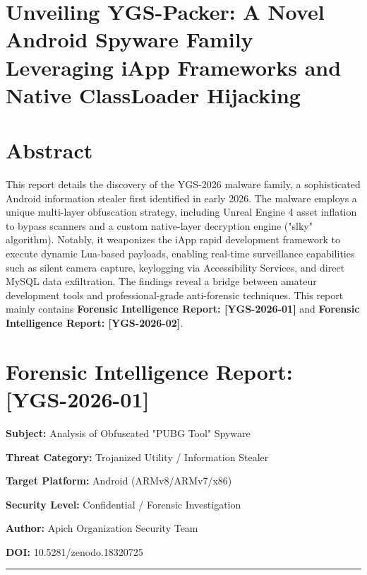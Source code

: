 \documentclass[
]{article}
\author{}
\date{}
\begin{document}
\section{Unveiling YGS-Packer: A Novel Android Spyware Family Leveraging
iApp Frameworks and Native ClassLoader
Hijacking}\label{unveiling-ygs-packer-a-novel-android-spyware-family-leveraging-iapp-frameworks-and-native-classloader-hijacking}

\section{Abstract}\label{abstract}

This report details the discovery of the YGS-2026 malware family, a
sophisticated Android information stealer first identified in early
2026. The malware employs a unique multi-layer obfuscation strategy,
including Unreal Engine 4 asset inflation to bypass scanners and a
custom native-layer decryption engine ("slky" algorithm). Notably, it
weaponizes the iApp rapid development framework to execute dynamic
Lua-based payloads, enabling real-time surveillance capabilities such as
silent camera capture, keylogging via Accessibility Services, and direct
MySQL data exfiltration. The findings reveal a bridge between amateur
development tools and professional-grade anti-forensic techniques. This
report mainly contains \textbf{Forensic Intelligence Report:
{[}YGS-2026-01{]}} and \textbf{Forensic Intelligence Report:
{[}YGS-2026-02{]}}.

\section{\texorpdfstring{\textbf{Forensic Intelligence Report:
{[}YGS-2026-01{]}}}{Forensic Intelligence Report: {[}YGS-2026-01{]}}}\label{forensic-intelligence-report-ygs-2026-01}

\textbf{Subject:} Analysis of Obfuscated "PUBG Tool" Spyware

\textbf{Threat Category:} Trojanized Utility / Information Stealer

\textbf{Target Platform:} Android (ARMv8/ARMv7/x86)

\textbf{Security Level:} Confidential / Forensic Investigation

\textbf{Author:} Apich Organization Security Team

\textbf{DOI:} 10.5281/zenodo.18320725

\begin{center}\rule{0.5\linewidth}{0.5pt}\end{center}
\end{document}
